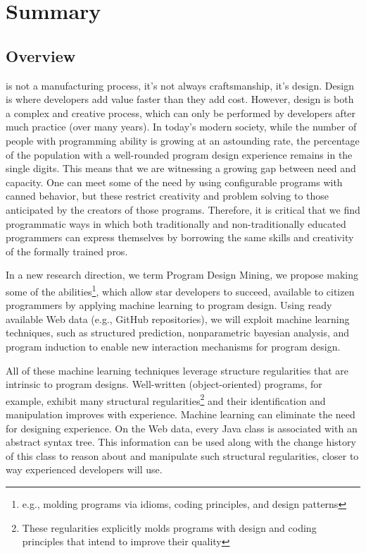 \chapter{Summary}{}
\label{sec:intro}

\section*{Overview} %
\label{sec:overview}

 is not a manufacturing process, it's not 
always craftsmanship, it's design. Design is where developers add 
value faster than they add cost. However, design is both a complex 
and creative process, which can only be performed by developers after 
much practice (over many years). In today’s modern society, while the 
number of people with programming ability is growing at an astounding 
rate, the percentage of the population with a well-rounded program 
design experience remains in the single digits. This means that we are 
witnessing a growing gap between need and capacity. One can meet some of 
the need by using configurable programs with canned behavior, but these 
restrict creativity and problem solving to those anticipated by the 
creators of those programs. Therefore, it is critical that we find 
programmatic ways in which both traditionally and non-traditionally 
educated programmers can express themselves by borrowing the same skills 
and creativity of the formally trained pros.

In a new research direction, we term Program Design Mining, we propose  
making some of the abilities\footnote{e.g., molding programs via idioms, coding principles, and design patterns}, which allow star developers to succeed, 
available to citizen programmers by applying machine learning to program 
design.  Using ready available Web data (e.g., GitHub 
repositories), we will exploit machine learning techniques, such as 
structured prediction, nonparametric bayesian analysis, and program 
induction to enable new interaction mechanisms for program design.

All of these machine learning techniques leverage structure regularities 
that are intrinsic to program designs. Well-written (object-oriented) programs, 
for example, exhibit many structural regularities\footnote{These regularities explicitly molds programs with design and coding principles that intend to improve their quality} and their identification and manipulation improves with experience. Machine 
learning can eliminate the need for designing experience. On the Web data, 
every Java class is associated with an abstract syntax tree. This information 
can be used along with the change history of this class to reason about and 
manipulate such structural regularities, closer to way experienced developers 
will use. 

